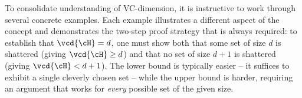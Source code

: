 %

To consolidate understanding of VC-dimension, it is instructive to work through several
concrete examples. Each example illustrates a different aspect of the concept and demonstrates
the two-step proof strategy that is always required: to establish that $\vcd{\cH} = d$, one
must show both that some set of size $d$ is shattered (giving $\vcd{\cH} \geq d$) and that no
set of size $d+1$ is shattered (giving $\vcd{\cH} < d+1$). The lower bound is typically
easier -- it suffices to exhibit a single cleverly chosen set -- while the upper bound is
harder, requiring an argument that works for \emph{every} possible set of the given size.

